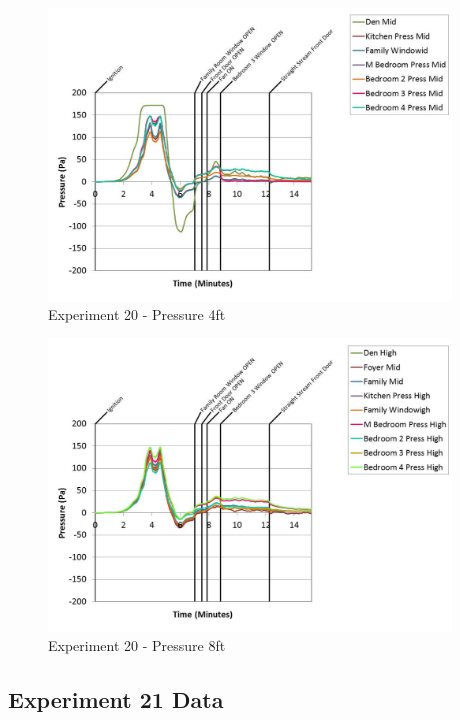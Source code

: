 \documentclass{article}
\begin{document}
\begin{appendices}
	\begin{figure}[h!]
		\centering
		\includegraphics[height=3.05in]{0_Images/Results_Charts/Exp_20_Charts/Pressure4ft.pdf}
		\caption{Experiment 20 - Pressure 4ft}
	\end{figure}
 
	\clearpage

	\begin{figure}[h!]
		\centering
		\includegraphics[height=3.05in]{0_Images/Results_Charts/Exp_20_Charts/Pressure8ft.pdf}
		\caption{Experiment 20 - Pressure 8ft}
	\end{figure}
 

		\clearpage
\clearpage		\large
\subsection{Experiment 21 Data} \label{App:Exp21Results} 


\end{appendices}
\end{document}
